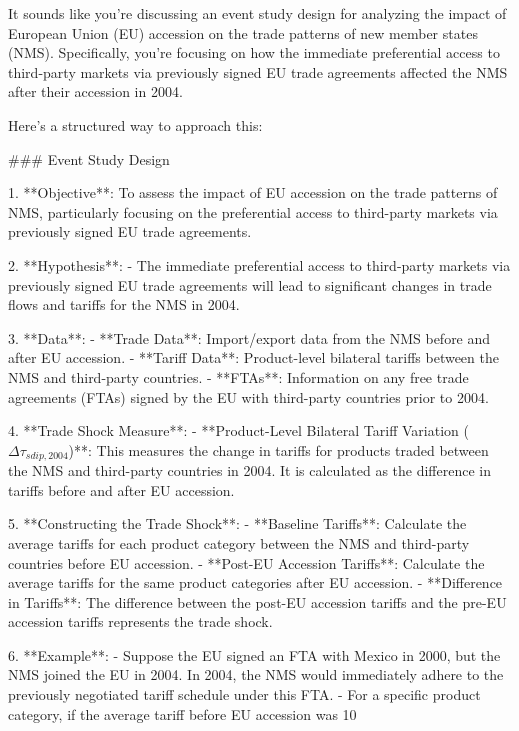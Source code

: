 It sounds like you're discussing an event study design for analyzing the impact of European Union (EU) accession on the trade patterns of new member states (NMS). Specifically, you're focusing on how the immediate preferential access to third-party markets via previously signed EU trade agreements affected the NMS after their accession in 2004.

Here’s a structured way to approach this:

### Event Study Design

1. **Objective**: To assess the impact of EU accession on the trade patterns of NMS, particularly focusing on the preferential access to third-party markets via previously signed EU trade agreements.

2. **Hypothesis**:
   - The immediate preferential access to third-party markets via previously signed EU trade agreements will lead to significant changes in trade flows and tariffs for the NMS in 2004.

3. **Data**:
   - **Trade Data**: Import/export data from the NMS before and after EU accession.
   - **Tariff Data**: Product-level bilateral tariffs between the NMS and third-party countries.
   - **FTAs**: Information on any free trade agreements (FTAs) signed by the EU with third-party countries prior to 2004.

4. **Trade Shock Measure**:
   - **Product-Level Bilateral Tariff Variation ($\Delta \tau_{sdip,2004}$)**: This measures the change in tariffs for products traded between the NMS and third-party countries in 2004. It is calculated as the difference in tariffs before and after EU accession.

5. **Constructing the Trade Shock**:
   - **Baseline Tariffs**: Calculate the average tariffs for each product category between the NMS and third-party countries before EU accession.
   - **Post-EU Accession Tariffs**: Calculate the average tariffs for the same product categories after EU accession.
   - **Difference in Tariffs**: The difference between the post-EU accession tariffs and the pre-EU accession tariffs represents the trade shock.

6. **Example**:
   - Suppose the EU signed an FTA with Mexico in 2000, but the NMS joined the EU in 2004. In 2004, the NMS would immediately adhere to the previously negotiated tariff schedule under this FTA.
   - For a specific product category, if the average tariff before EU accession was 10%

